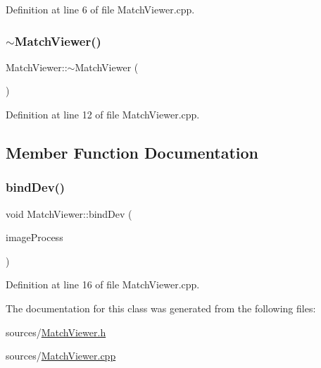 Definition at line 6 of file Match\+Viewer.\+cpp.

\mbox{\label{class_match_viewer_aa073473c302a0af0a9433e20af513b23}} 
\subsubsection{\texorpdfstring{$\sim$\+Match\+Viewer()}{~MatchViewer()}}
{\footnotesize\ttfamily Match\+Viewer\+::$\sim$\+Match\+Viewer (\begin{DoxyParamCaption}{ }\end{DoxyParamCaption})}



Definition at line 12 of file Match\+Viewer.\+cpp.



\subsection{Member Function Documentation}
\mbox{\label{class_match_viewer_abdabdcff52f99428a2cec3f8422a529f}} 
\subsubsection{\texorpdfstring{bind\+Dev()}{bindDev()}}
{\footnotesize\ttfamily void Match\+Viewer\+::bind\+Dev (\begin{DoxyParamCaption}\item[{\mbox{\hyperlink{class_image_process}{Image\+Process}} $\ast$}]{image\+Process }\end{DoxyParamCaption})}



Definition at line 16 of file Match\+Viewer.\+cpp.



The documentation for this class was generated from the following files\+:\begin{DoxyCompactItemize}
\item 
sources/\mbox{\hyperlink{_match_viewer_8h}{Match\+Viewer.\+h}}\item 
sources/\mbox{\hyperlink{_match_viewer_8cpp}{Match\+Viewer.\+cpp}}\end{DoxyCompactItemize}
